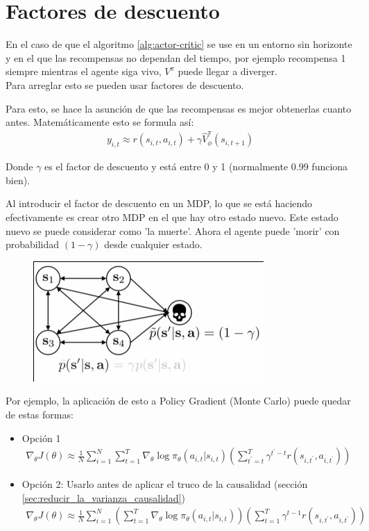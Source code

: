 \section{Factores de descuento}%
\label{sec:factores_de_descuento}

En el caso de que el algoritmo \ref{alg:actor-critic} se use en un entorno sin horizonte y en
el que las recompensas no dependan del tiempo, por ejemplo recompensa 1 siempre mientras el
agente siga vivo, $V^\pi$ puede llegar a diverger.\\ Para arreglar esto se pueden usar factores
de descuento.

Para esto, se hace la asunción de que las recompensas es mejor obtenerlas cuanto antes.
Matemáticamente esto se formula así:
\begin{align}
y _ { i , t } \approx r ( s _ { i , t } , a _ { i , t } ) + \gamma \hat { V } _ { \phi } ^ { \pi } ( s _ { i , t + 1 } )
\end{align}

Donde $\gamma$ es el factor de descuento y está entre 0 y 1 (normalmente 0.99 funciona bien).

Al introducir el factor de descuento en un MDP, lo que se está haciendo efectivamente es
crear otro MDP en el que hay otro estado nuevo. Este estado nuevo se puede considerar como 'la
muerte'. Ahora el agente puede 'morir' con probabilidad $(1-\gamma)$ desde cualquier estado.

\begin{figure}[htpb]
	\centering
	\includegraphics[width=0.3\linewidth]{figures/2020-06-14-114943_332x173_scrot.png}
\end{figure}

Por ejemplo, la aplicación de esto a Policy Gradient (Monte Carlo) puede quedar de estas formas:
\begin{itemize}
    \item Opción 1
        \begin{align}
\nabla _ { \theta } J ( \theta ) \approx \frac { 1 } { N } \sum _ { i = 1 } ^ { N } \sum _ { t = 1 } ^ { T } \nabla _ { \theta } \operatorname { log } \pi _ { \theta } ( a _ { i , t } | s _ { i , t } ) ( \sum _ { t ^ { \prime } = t } ^ { T } \gamma ^ { t ^ { \prime } - t } r ( s _ { i , t ^ { \prime } } , a _ { i , t ^ { \prime } } ) )
        \end{align}
    \item Opción 2: Usarlo antes de aplicar el truco de la causalidad
        (sección \ref{sec:reducir_la_varianza_causalidad})
        \begin{align}
\nabla _ { \theta } J ( \theta ) \approx \frac { 1 } { N } \sum _ { i = 1 } ^ { N } ( \sum _ { t = 1 } ^ { T } \nabla _ { \theta } \operatorname { log } \pi _ { \theta } ( a _ { i , t } | s _ { i , t } ) ) ( \sum _ { t = 1 } ^ { T } \gamma ^ { t - 1 } r ( s _ { i , t ^ { \prime } } , a _ { i , t ^ { \prime } } ) )
        \end{align}
\end{itemize}

